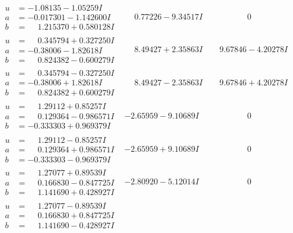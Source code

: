 \documentclass[1p]{elsarticle_modified}
\theoremstyle{definition}
\begin{document}
$$\begin{array}{c|c|c}
\begin{aligned}
u &= -1.08135 - 1.05259 I \\
a &= -0.017301 - 1.142600 I \\
b &= \phantom{-}1.215370 + 0.580128 I\end{aligned}
 & \phantom{-}0.77226 - 9.34517 I & \phantom{-0.000000 } 0 \\ \hline\begin{aligned}
u &= \phantom{-}0.345794 + 0.327250 I \\
a &= -0.38006 - 1.82618 I \\
b &= \phantom{-}0.824382 - 0.600279 I\end{aligned}
 & \phantom{-}8.49427 + 2.35863 I & \phantom{-}9.67846 - 4.20278 I \\ \hline\begin{aligned}
u &= \phantom{-}0.345794 - 0.327250 I \\
a &= -0.38006 + 1.82618 I \\
b &= \phantom{-}0.824382 + 0.600279 I\end{aligned}
 & \phantom{-}8.49427 - 2.35863 I & \phantom{-}9.67846 + 4.20278 I \\ \hline\begin{aligned}
u &= \phantom{-}1.29112 + 0.85257 I \\
a &= \phantom{-}0.129364 - 0.986571 I \\
b &= -0.333303 + 0.969379 I\end{aligned}
 & -2.65959 - 9.10689 I & \phantom{-0.000000 } 0 \\ \hline\begin{aligned}
u &= \phantom{-}1.29112 - 0.85257 I \\
a &= \phantom{-}0.129364 + 0.986571 I \\
b &= -0.333303 - 0.969379 I\end{aligned}
 & -2.65959 + 9.10689 I & \phantom{-0.000000 } 0 \\ \hline\begin{aligned}
u &= \phantom{-}1.27077 + 0.89539 I \\
a &= \phantom{-}0.166830 - 0.847725 I \\
b &= \phantom{-}1.141690 + 0.428927 I\end{aligned}
 & -2.80920 - 5.12014 I & \phantom{-0.000000 } 0 \\ \hline\begin{aligned}
u &= \phantom{-}1.27077 - 0.89539 I \\
a &= \phantom{-}0.166830 + 0.847725 I \\
b &= \phantom{-}1.141690 - 0.428927 I\end{aligned}

\end{array}$$
\end{document}

